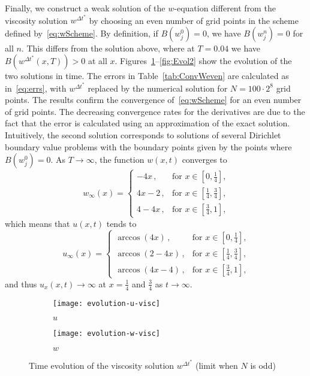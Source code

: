 \documentclass[11pt,leqno]{amsart}
\begin{document}
Finally, we construct a weak solution of the $w$-equation different from the viscosity solution $w^{\Delta t^*}$ by choosing an even number of grid points in the scheme defined by~\eqref{eq:wScheme}. By definition, if $B(w^0_j)=0$, we have $B(w^n_j)=0$ for all $n$. This differs from the solution above, where at $T=0.04$ we have $B(w^{\Delta t^*}(x,T))>0$ at all $x$. Figures~\ref{fig:Evol}--\ref{fig:Evol2} show the evolution of the two solutions in time. The errors in Table~\ref{tab:ConvWeven} are calculated as in~\eqref{eq:errs}, with $w^{\Delta t^*}$ replaced by the numerical solution for $N=100\cdot 2^8$ grid points. The results confirm the convergence of~\eqref{eq:wScheme} for an even number of grid points. The decreasing convergence rates for the derivatives are due to the fact that the error is calculated using an approximation of the exact solution. 
Intuitively, the second solution corresponds to solutions of several Dirichlet boundary value problems with the boundary points given by the points where $B(w^0_j)=0$.  As $T\rightarrow \infty$, the function $w(x,t)$ converges to
\begin{equation*}
  w_\infty(x)= \begin{cases} -4 x\,, & \text{for $x\in [0,\frac{1}{4} ]$,}\\
    4 x- 2 \,, &\text{for $x\in [\frac{1}{4} ,\frac{3}{4} ]$,}\\ 
4 - 4  x\,,&\text{for $x \in [\frac{3}{4} ,1]$,} \end{cases}
\end{equation*}
which means that $u(x,t)$ tends to
\begin{equation*}
  u_\infty(x)= \begin{cases} \arccos(4x)\,, & \text{for $x\in [0,\frac{1}{4} ]$,}\\
   \arccos(2-4x) \,, &\text{for $x\in [\frac{1}{4} ,\frac{3}{4} ]$,}\\ 
\arccos(4x-4)\,,&\text{for $x \in [\frac{3}{4} ,1]$,} \end{cases}  
\end{equation*}
 and thus $u_{x}(x,t)\rightarrow \infty$ at $x=\frac{1}{4}$ and $\frac{3}{4}$ as $t\rightarrow \infty$.
\begin{figure}
  \centering
  \begin{subfigure}[b]{.45\textwidth}\centering
  \texttt{[image: evolution-u-visc]}
\caption{$u$}    
  \end{subfigure}
  \begin{subfigure}[b]{.45\textwidth}\centering
  \texttt{[image: evolution-w-visc]}
\caption{$w$}    
  \end{subfigure}
  \caption{Time evolution of the viscosity solution $w^{\Delta t^*}$ (limit when $N$ is odd)}\label{fig:Evol}
\end{figure}
\end{document}
